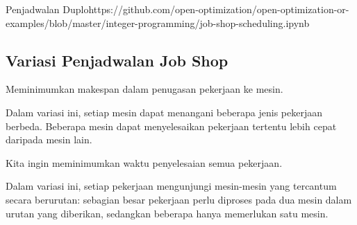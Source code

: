 \begin{examplewithallcode}{Penjadwalan Duplo}{}{}{https://github.com/open-optimization/open-optimization-or-examples/blob/master/integer-programming/job-shop-scheduling.ipynb}
\begin{center}

\par{}\label{fig:jssp-duplo-actual}%

\end{center}
\end{examplewithallcode}

\subsection{Variasi Penjadwalan Job Shop}

Meminimumkan makespan dalam penugasan pekerjaan ke mesin.

Dalam variasi ini, setiap mesin dapat menangani beberapa jenis pekerjaan berbeda. Beberapa mesin dapat menyelesaikan pekerjaan tertentu lebih cepat daripada mesin lain.

Kita ingin meminimumkan waktu penyelesaian semua pekerjaan.

Dalam variasi ini, setiap pekerjaan mengunjungi mesin-mesin yang tercantum secara berurutan: sebagian besar pekerjaan perlu diproses pada dua mesin dalam urutan yang diberikan, sedangkan beberapa hanya memerlukan satu mesin.


